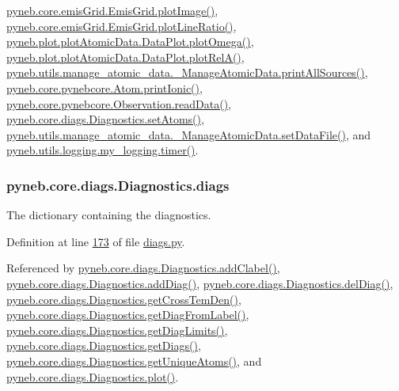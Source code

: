 \hyperlink{emis_grid_8py_source_l00140}{pyneb.\-core.\-emis\-Grid.\-Emis\-Grid.\-plot\-Image()}, \hyperlink{emis_grid_8py_source_l00241}{pyneb.\-core.\-emis\-Grid.\-Emis\-Grid.\-plot\-Line\-Ratio()}, \hyperlink{plot_atomic_data_8py_source_l00373}{pyneb.\-plot.\-plot\-Atomic\-Data.\-Data\-Plot.\-plot\-Omega()}, \hyperlink{plot_atomic_data_8py_source_l00262}{pyneb.\-plot.\-plot\-Atomic\-Data.\-Data\-Plot.\-plot\-Rel\-A()}, \hyperlink{manage__atomic__data_8py_source_l00431}{pyneb.\-utils.\-manage\-\_\-atomic\-\_\-data.\-\_\-\-Manage\-Atomic\-Data.\-print\-All\-Sources()}, \hyperlink{pynebcore_8py_source_l02233}{pyneb.\-core.\-pynebcore.\-Atom.\-print\-Ionic()}, \hyperlink{pynebcore_8py_source_l03711}{pyneb.\-core.\-pynebcore.\-Observation.\-read\-Data()}, \hyperlink{diags_8py_source_l00393}{pyneb.\-core.\-diags.\-Diagnostics.\-set\-Atoms()}, \hyperlink{manage__atomic__data_8py_source_l00380}{pyneb.\-utils.\-manage\-\_\-atomic\-\_\-data.\-\_\-\-Manage\-Atomic\-Data.\-set\-Data\-File()}, and \hyperlink{logging_8py_source_l00115}{pyneb.\-utils.\-logging.\-my\-\_\-logging.\-timer()}.

\hypertarget{classpyneb_1_1core_1_1diags_1_1_diagnostics_a0c0f7e36097677f61a6a14a0c3127b02}{
\subsubsection[{diags}]{\setlength{\rightskip}{0pt plus 5cm}pyneb.\-core.\-diags.\-Diagnostics.\-diags}}\label{classpyneb_1_1core_1_1diags_1_1_diagnostics_a0c0f7e36097677f61a6a14a0c3127b02}


The dictionary containing the diagnostics. 



Definition at line \hyperlink{diags_8py_source_l00173}{173} of file \hyperlink{diags_8py_source}{diags.\-py}.



Referenced by \hyperlink{diags_8py_source_l00410}{pyneb.\-core.\-diags.\-Diagnostics.\-add\-Clabel()}, \hyperlink{diags_8py_source_l00246}{pyneb.\-core.\-diags.\-Diagnostics.\-add\-Diag()}, \hyperlink{diags_8py_source_l00336}{pyneb.\-core.\-diags.\-Diagnostics.\-del\-Diag()}, \hyperlink{diags_8py_source_l00554}{pyneb.\-core.\-diags.\-Diagnostics.\-get\-Cross\-Tem\-Den()}, \hyperlink{diags_8py_source_l00183}{pyneb.\-core.\-diags.\-Diagnostics.\-get\-Diag\-From\-Label()}, \hyperlink{diags_8py_source_l00706}{pyneb.\-core.\-diags.\-Diagnostics.\-get\-Diag\-Limits()}, \hyperlink{diags_8py_source_l00201}{pyneb.\-core.\-diags.\-Diagnostics.\-get\-Diags()}, \hyperlink{diags_8py_source_l00237}{pyneb.\-core.\-diags.\-Diagnostics.\-get\-Unique\-Atoms()}, and \hyperlink{diags_8py_source_l00421}{pyneb.\-core.\-diags.\-Diagnostics.\-plot()}.

